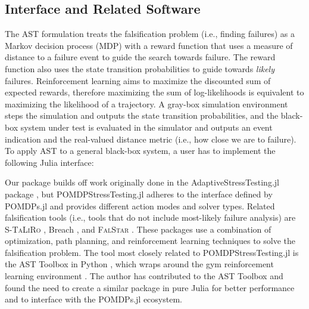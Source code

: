 \subsection{Interface and Related Software}
The AST formulation treats the falsification problem (i.e., finding failures) as a Markov decision process (MDP) with a reward function that uses a measure of distance to a failure event to guide the search towards failure.
The reward function also uses the state transition probabilities to guide towards \textit{likely} failures.
Reinforcement learning aims to maximize the discounted sum of expected rewards, therefore maximizing the sum of log-likelihoods is equivalent to maximizing the likelihood of a trajectory.
A gray-box simulation environment steps the simulation and outputs the state transition probabilities, and the black-box system under test is evaluated in the simulator and outputs an event indication and the real-valued distance metric (i.e., how close we are to failure).
To apply AST to a general black-box system, a user has to implement the following Julia interface:



Our package builds off work originally done in the AdaptiveStressTesting.jl package \cite{lee2019adaptive}, but POMDPStressTesting.jl adheres to the interface defined by POMDPs.jl and provides different action modes and solver types.
Related falsification tools (i.e., tools that do not include most-likely failure analysis) are \textsc{S-TaLiRo} \cite{annapureddy2011staliro}, Breach \cite{breach}, and \textsc{FalStar} \cite{falstar}.
These packages use a combination of optimization, path planning, and reinforcement learning techniques to solve the falsification problem.
The tool most closely related to POMDPStressTesting.jl is the AST Toolbox in Python \cite{koren2018adaptive}, which wraps around the gym reinforcement learning environment \cite{gym}.
The author has contributed to the AST Toolbox and found the need to create a similar package in pure Julia for better performance and to interface with the POMDPs.jl ecosystem.


